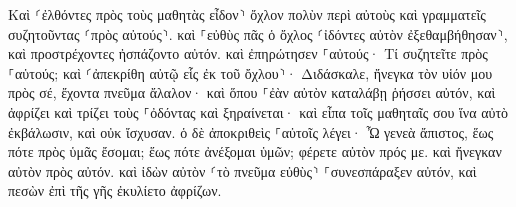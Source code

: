 \documentclass{openreader}
\begin{document}
Καὶ ⸂ἐλθόντες πρὸς τοὺς μαθητὰς εἶδον⸃ ὄχλον πολὺν περὶ αὐτοὺς καὶ γραμματεῖς συζητοῦντας ⸂πρὸς αὐτούς⸃. 
καὶ ⸀εὐθὺς πᾶς ὁ ὄχλος ⸂ἰδόντες αὐτὸν ἐξεθαμβήθησαν⸃, καὶ προστρέχοντες ἠσπάζοντο αὐτόν. 
καὶ ἐπηρώτησεν ⸀αὐτούς· Τί συζητεῖτε πρὸς ⸀αὑτούς; 
καὶ ⸂ἀπεκρίθη αὐτῷ εἷς ἐκ τοῦ ὄχλου⸃· Διδάσκαλε, ἤνεγκα τὸν υἱόν μου πρὸς σέ, ἔχοντα πνεῦμα ἄλαλον· 
καὶ ὅπου ⸀ἐὰν αὐτὸν καταλάβῃ ῥήσσει αὐτόν, καὶ ἀφρίζει καὶ τρίζει τοὺς ⸀ὀδόντας καὶ ξηραίνεται· καὶ εἶπα τοῖς μαθηταῖς σου ἵνα αὐτὸ ἐκβάλωσιν, καὶ οὐκ ἴσχυσαν. 
ὁ δὲ ἀποκριθεὶς ⸀αὐτοῖς λέγει· Ὦ γενεὰ ἄπιστος, ἕως πότε πρὸς ὑμᾶς ἔσομαι; ἕως πότε ἀνέξομαι ὑμῶν; φέρετε αὐτὸν πρός με. 
καὶ ἤνεγκαν αὐτὸν πρὸς αὐτόν. καὶ ἰδὼν αὐτὸν ⸂τὸ πνεῦμα εὐθὺς⸃ ⸀συνεσπάραξεν αὐτόν, καὶ πεσὼν ἐπὶ τῆς γῆς ἐκυλίετο ἀφρίζων. 
\end{document}
